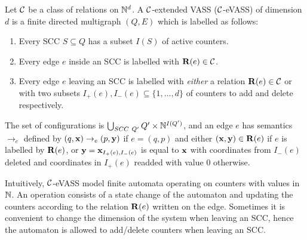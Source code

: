 
Let \(\mathcal{C}\) be a class of relations on \(\mathbb{N}^d\). A \(\mathcal{C}\)-extended VASS (\(\mathcal{C}\)-eVASS) of dimension \(d\) is a finite directed multigraph \((Q,E)\) which is labelled as follows:

\begin{enumerate}
\item Every SCC \(S \subseteq Q\) has a subset \(I(S)\) of active counters.
\item Every edge \(e\) inside an SCC is labelled with \(\mathbf{R}(e) \in \mathcal{C}\).
\item Every edge \(e\) leaving an SCC is labelled with \emph{either} a relation \(\mathbf{R}(e) \in \mathcal{C}\) or with two subsets \(I_+(e), I_-(e) \subseteq \{1,\dots, d\}\) of counters to add and delete respectively.
\end{enumerate}

The set of configurations is \(\bigcup_{SCC\ Q'} Q' \times \N^{I(Q')}\), and an edge \(e\) has semantics \(\to_e\) defined by \((q,\mathbf{x}) \to_e (p, \mathbf{y})\) if \(e=(q,p)\) and either \((\mathbf{x}, \mathbf{y}) \in \mathbf{R}(e)\) if \(e\) is labelled by \(\mathbf{R}(e)\), or \(\mathbf{y}=\mathbf{x}_{I_+(e), I_-(e)}\)  is equal to \(\mathbf{x}\) with coordinates from \(I_-(e)\) deleted and coordinates in \(I_+(e)\) readded with value \(0\) otherwise.


Intuitively, \(\mathcal{C}\)-eVASS model finite automata operating on counters with values in \(\mathbb{N}\). An operation consists of a state change of the automaton and updating the counters according to the relation \(\mathbf{R}(e)\) written on the edge. Sometimes it is convenient to change the dimension of the system when leaving an SCC, hence the automaton is allowed to add/delete counters when leaving an SCC.


